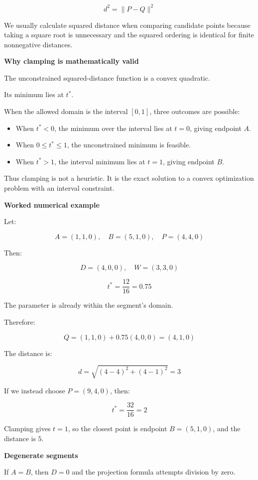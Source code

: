 \[
\boxed{ d^2=\|P-Q\|^2 }
\]

We usually calculate squared distance when comparing candidate points because taking a square root is unnecessary and the squared ordering is identical for finite nonnegative distances.

\textbf{Why clamping is mathematically valid}

The unconstrained squared-distance function is a convex quadratic.

Its minimum lies at \(t^*\).

When the allowed domain is the interval \([0,1]\), three outcomes are possible:

\begin{itemize}
\tightlist
\item
  When \(t^*<0\), the minimum over the interval lies at \(t=0\), giving endpoint \(A\).
\item
  When \(0\le t^*\le1\), the unconstrained minimum is feasible.
\item
  When \(t^*>1\), the interval minimum lies at \(t=1\), giving endpoint \(B\).
\end{itemize}

Thus clamping is not a heuristic. It is the exact solution to a convex optimization problem with an interval constraint.

\textbf{Worked numerical example}

Let:

\[
A=(1,1,0),\quad B=(5,1,0),\quad P=(4,4,0)
\]

Then:

\[
D=(4,0,0),\quad W=(3,3,0)
\]

\[
t^*=\frac{12}{16}=0.75
\]

The parameter is already within the segment's domain.

Therefore:

\[
Q=(1,1,0)+0.75(4,0,0)=(4,1,0)
\]

The distance is:

\[
d=\sqrt{(4-4)^2+(4-1)^2}=3
\]

If we instead choose \(P=(9,4,0)\), then:

\[
t^*=\frac{32}{16}=2
\]

Clamping gives \(t=1\), so the closest point is endpoint \(B=(5,1,0)\), and the distance is \(5\).

\textbf{Degenerate segments}

If \(A=B\), then \(D=0\) and the projection formula attempts division by zero.

